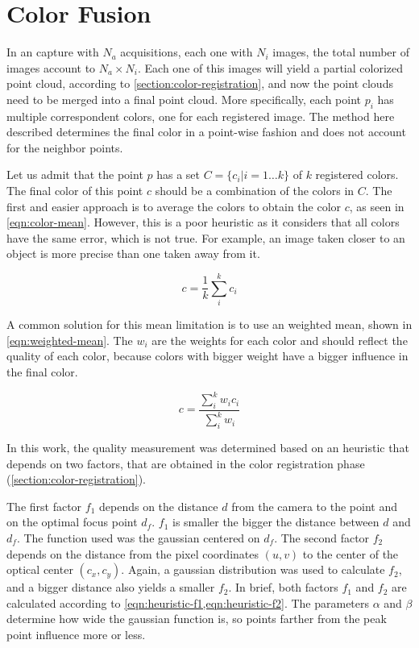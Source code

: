 \section{Color Fusion}
\label{section:color-fusion}

In an capture with $N_a$ acquisitions, each one with $N_i$ images, the total number of images account to $N_a \times N_i$. Each one of this images will yield a partial colorized point cloud, according to \cref{section:color-registration}, and now the point clouds need to be merged into a final point cloud. More specifically, each point $p_i$ has multiple correspondent colors, one for each registered image. The method here described determines the final color in a point-wise fashion and does not account for the neighbor points.

Let us admit that the point $p$ has a set $C = \{c_i|i=1\dots k\}$ of $k$ registered colors. The final color of this point $c$ should be a combination of the colors in $C$. The first and easier approach is to average the colors to obtain the color $c$, as seen in \cref{eqn:color-mean}. However, this is a poor heuristic as it considers that all colors have the same error, which is not true. For example, an image taken closer to an object is more precise than one taken away from it. 

\begin{equation}
    \label{eqn:color-mean}
    c = \frac{1}{k} \sum_{i}^{k}{c_i}
\end{equation}

A common solution for this mean limitation is to use an weighted mean, shown in \cref{eqn:weighted-mean}. The $w_i$ are the weights for each color and should reflect the quality of each color, because colors with bigger weight have a bigger influence in the final color.

\begin{equation}
    \label{eqn:weighted-mean}
    c = \frac{\sum_{i}^{k}{w_i c_i}}{\sum_{i}^{k}{w_i}}
\end{equation}

In this work, the quality measurement was determined based on an heuristic that depends on two factors, that are obtained in the color registration phase (\cref{section:color-registration}).

The first factor $f_1$ depends on the distance $d$ from the camera to the point and on the optimal focus point $d_f$. $f_1$ is smaller the bigger the distance between $d$ and $d_f$. The function used was the gaussian centered on $d_f$. The second factor $f_2$ depends on the distance from the pixel coordinates $(u,v)$ to the center of the optical center $(c_x, c_y)$. Again, a gaussian distribution was used to calculate $f_2$, and a bigger distance also yields a smaller $f_2$. In brief, both factors $f_1$ and $f_2$ are calculated according to \cref{eqn:heuristic-f1,eqn:heuristic-f2}. The parameters $\alpha$ and $\beta$ determine how wide the gaussian function is, so points farther from the peak point influence more or less. 

